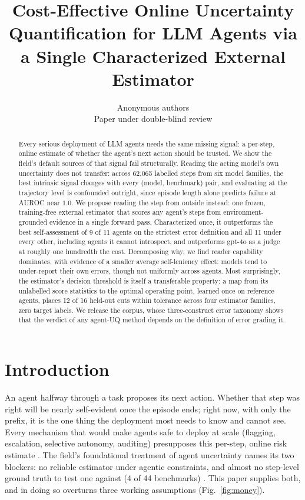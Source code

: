 \documentclass{article}
\title{Cost-Effective Online Uncertainty Quantification for LLM Agents via a
Single Characterized External Estimator}
\author{Anonymous authors\\Paper under double-blind review}
\begin{document}
\maketitle

\begin{abstract}
Every serious deployment of LLM agents needs the same missing signal: a
per-step, online estimate of whether the agent's next action should be
trusted. We show the field's default sources of that signal fail structurally.
Reading the acting model's own uncertainty does not transfer: across 62{,}065
labelled steps from six model families, the best intrinsic signal changes
with every (model, benchmark) pair, and evaluating at the trajectory level is
confounded outright, since episode length alone predicts failure at AUROC
near $1.0$. We propose reading the step from outside instead: one frozen,
training-free external estimator that scores any agent's steps from
environment-grounded evidence in a single forward pass. Characterized once,
it outperforms the best self-assessment of 9 of 11 agents on the strictest
error definition and all 11 under every other, including agents it cannot
introspect, and outperforms gpt-4o as a judge at roughly one hundredth the
cost. Decomposing why, we find reader capability dominates, with evidence of a
smaller average self-leniency effect: models tend to under-report their own
errors, though not uniformly across agents. Most surprisingly, the estimator's decision threshold is
itself a transferable property: a map from its unlabelled score statistics
to the optimal operating point, learned once on reference agents, places 12
of 16 held-out cuts within tolerance across four estimator families, zero
target labels. We release the corpus, whose three-construct error taxonomy
shows that the verdict of any agent-UQ method depends on the definition of
error grading it.
\end{abstract}

\section{Introduction}\label{sec:intro}
An agent halfway through a task proposes its next action. Whether that step
was right will be nearly self-evident once the episode ends; right now, with
only the prefix, it is the one thing the deployment most needs to know and
cannot see. Every mechanism that would make agents safe to deploy at scale
(flagging, escalation, selective autonomy, auditing) presupposes this
per-step, online risk estimate \citep{oh2026uncertainty,ren2023robots}. The
field's foundational treatment of agent uncertainty names its two blockers:
no reliable estimator under agentic constraints, and almost no step-level
ground truth to test one against (4 of 44 benchmarks)
\citep{oh2026uncertainty}. This paper supplies both, and in doing so
overturns three working assumptions (Fig.~\ref{fig:money}).
\end{document}
